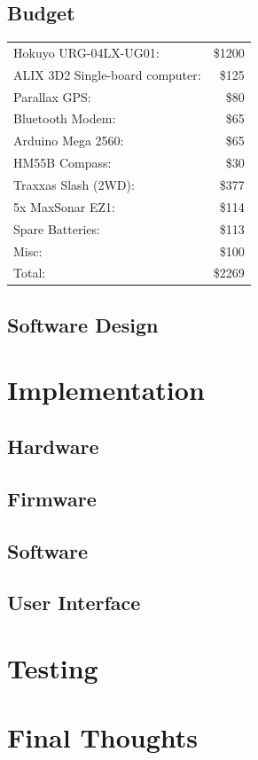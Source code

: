 \documentclass[a4paper,12pt]{article}
\begin{document}
\subsection{Budget}
\begin{tabular}{lr}
Hokuyo URG-04LX-UG01: & \$1200 \\
ALIX 3D2 Single-board computer: & \$125 \\
Parallax GPS: & \$80 \\
Bluetooth Modem: & \$65 \\ 
Arduino Mega 2560: & \$65 \\ 
HM55B Compass: & \$30 \\ 
Traxxas Slash (2WD): & \$377 \\ 
5x MaxSonar EZ1: & \$114 \\
Spare Batteries: & \$113 \\
Misc: & ~\$100 \\
\hline
Total: & \$2269
\end{tabular}

\subsection{Software Design}


\section{Implementation}
\subsection{Hardware}


\subsection{Firmware}


\subsection{Software}


\subsection{User Interface}


\section{Testing}


\section{Final Thoughts}



\end{document}
